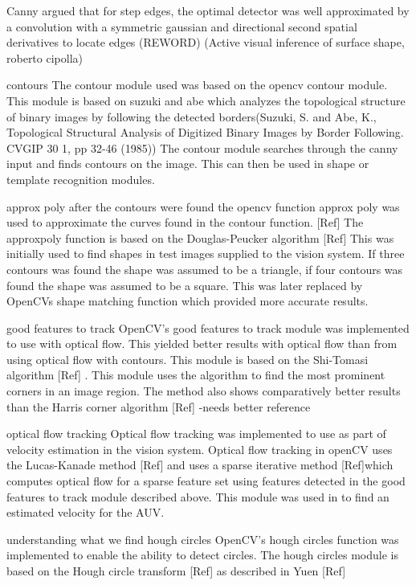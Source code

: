 Canny argued that for step edges, the optimal detector was well approximated by a convolution with a symmetric gaussian and directional second spatial derivatives to locate edges (REWORD) (Active visual inference of surface shape, roberto cipolla)

contours
The contour module used was based on the opencv contour module. This module is based on suzuki and abe which analyzes the topological structure of binary
images by following the detected borders(Suzuki, S. and Abe, K., Topological Structural Analysis of Digitized Binary Images by Border Following. CVGIP 30 1, pp 32-46 (1985)) 
The contour module searches through the canny input and finds contours on the image. This can then be used in shape or template recognition modules.

approx poly
after the contours were found the opencv function approx poly was used to approximate the curves found in the contour function. [Ref] The approxpoly function is based on the Douglas-Peucker algorithm [Ref]
This was initially used to find shapes in test images supplied to the vision system. If three contours was found the shape was assumed to be a triangle, if four contours was found the shape was assumed to be a square. This was later replaced by OpenCVs shape matching function which provided more accurate results.

good features to track
OpenCV’s good features to track module was implemented to use with optical flow. This yielded better results with optical flow than from using optical flow with contours. This module is based on the Shi-Tomasi algorithm [Ref] . This module uses the algorithm to find the most prominent corners in an image region. The method also shows comparatively better results than the Harris corner algorithm [Ref] -needs better reference

optical flow tracking
Optical flow tracking was implemented to use as part of velocity estimation in the vision system. Optical flow tracking in openCV uses the Lucas-Kanade method [Ref]   and uses a sparse iterative method [Ref]which computes optical flow for a sparse feature set using features detected in the good features to track module described above. This module was used in to find an estimated velocity for the AUV.


understanding what we find
hough circles
OpenCV’s hough circles function was implemented to enable the ability to detect circles. The hough circles module is based on the Hough circle transform [Ref] as described in Yuen [Ref] 

